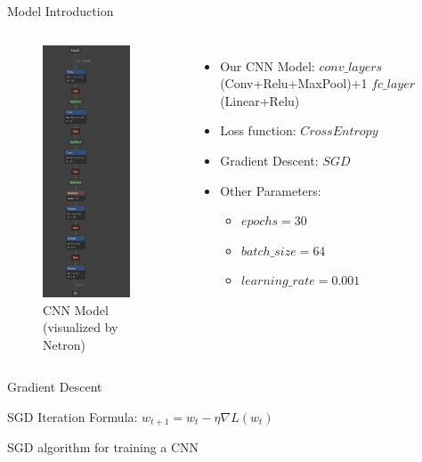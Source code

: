 \documentclass{beamer}
\begin{document}
\begin{frame}{Model Introduction}
	\begin{columns}[T,onlytextwidth]
		\begin{figure}
			\centering 
			\includegraphics[width=0.85\columnwidth, height=7.5cm]{img/model.png}
			\caption{CNN Model (visualized by Netron)}
		\end{figure}

		\begin{itemize}
			\item Our CNN Model:  $conv\_layers$ (Conv+Relu+MaxPool)\newline+1 $fc\_layer$ (Linear+Relu)
			\item Loss function: $CrossEntropy$
			\item Gradient Descent: $SGD$
			\item Other Parameters: 
				\begin{itemize}
					\item $epochs=30$
					\item $batch\_size=64$
					\item $learning\_rate=0.001$
				\end{itemize}
		\end{itemize}
	\end{columns}
\end{frame}


\begin{frame}{Gradient Descent}
	\begin{theorem}
		SGD Iteration Formula: $w_{t+1} = w_t - \eta \nabla L(w_t)$
	\end{theorem}
	\begin{algorithm}[H]
		\SetAlgoLined
		\caption{SGD algorithm for training a CNN}
	\end{algorithm}
\end{frame}
\end{document}
